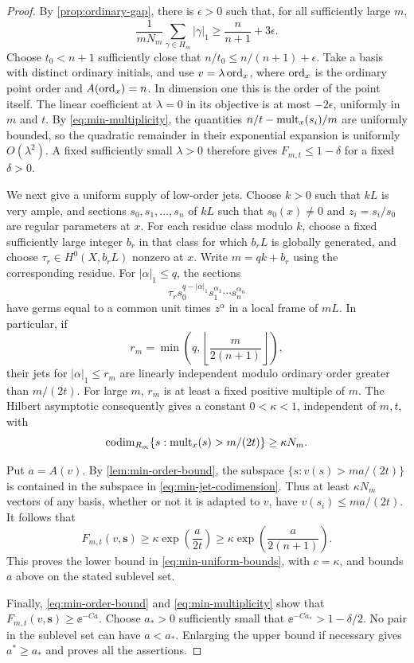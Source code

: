 \begin{proof}
By \cref{prop:ordinary-gap}, there is $\epsilon>0$ such that, for all sufficiently large $m$,
\[
 \frac1{mN_m}\sum_{\gamma\in H_m}|\gamma|_1
       \geq\frac n{n+1}+3\epsilon.
\]
Choose $t_0<n+1$ sufficiently close that $n/t_0\leq n/(n+1)+\epsilon$. Take a basis with distinct ordinary initials, and use $v=\lambda\operatorname{ord}_x$, where $\operatorname{ord}_x$ is the ordinary point order and ${A}(\operatorname{ord}_x)=n$. In dimension one this is the order of the point itself. The linear coefficient at $\lambda=0$ in its objective is at most $-2\epsilon$, uniformly in $m$ and $t$. By \eqref{eq:min-multiplicity}, the quantities $n/t-\operatorname{mult}_x(s_i)/m$ are uniformly bounded, so the quadratic remainder in their exponential expansion is uniformly $O(\lambda^2)$. A fixed sufficiently small $\lambda>0$ therefore gives $F_{m,t}\leq1-\delta$ for a fixed $\delta>0$.

We next give a uniform supply of low-order jets. Choose $k>0$ such that $kL$ is very ample, and sections $s_0,s_1,\ldots,s_n$ of $kL$ such that $s_0(x)\ne0$ and $z_i=s_i/s_0$ are regular parameters at $x$. For each residue class modulo $k$, choose a fixed sufficiently large integer $b_r$ in that class for which $b_rL$ is globally generated, and choose $\tau_r\in H^0(X,b_rL)$ nonzero at $x$. Write $m=qk+b_r$ using the corresponding residue. For $|\alpha|_1\leq q$, the sections
\[
 \tau_r s_0^{q-|\alpha|_1}s_1^{\alpha_1}\cdots s_n^{\alpha_n}
\]
have germs equal to a common unit times $z^\alpha$ in a local frame of $mL$. In particular, if
\[
 r_m=\min\left(q,\left\lfloor\frac{m}{2(n+1)}\right\rfloor\right),
\]
their jets for $|\alpha|_1\leq r_m$ are linearly independent modulo ordinary order greater than $m/(2t)$. For large $m$, $r_m$ is at least a fixed positive multiple of $m$. The Hilbert asymptotic consequently gives a constant $0<\kappa<1$, independent of $m,t$, with
\begin{equation}
\label{eq:min-jet-codimension}
 \operatorname{codim}_{R_m}\{s:\operatorname{mult}_x(s)>m/(2t)\}\geq\kappa N_m.
\end{equation}

Put $a={A}(v)$. By \cref{lem:min-order-bound}, the subspace $\{s:v(s)>ma/(2t)\}$ is contained in the subspace in \eqref{eq:min-jet-codimension}. Thus at least $\kappa N_m$ vectors of any basis, whether or not it is adapted to $v$, have $v(s_i)\leq ma/(2t)$. It follows that
\begin{equation}
\label{eq:min-coercive-exponential}
 F_{m,t}(v,\mathbf{s})
   \geq\kappa\exp\!\left(\frac a{2t}\right)
   \geq\kappa\exp\!\left(\frac a{2(n+1)}\right).
\end{equation}
This proves the lower bound in \eqref{eq:min-uniform-bounds}, with $c=\kappa$, and bounds $a$ above on the stated sublevel set.

Finally, \eqref{eq:min-order-bound} and \eqref{eq:min-multiplicity} show that $F_{m,t}(v,\mathbf{s})\geq \ee^{-Ca}$. Choose $a_*>0$ sufficiently small that $\ee^{-Ca_*}>1-\delta/2$. No pair in the sublevel set can have $a<a_*$. Enlarging the upper bound if necessary gives $a^*\geq a_*$ and proves all the assertions.
\end{proof}

